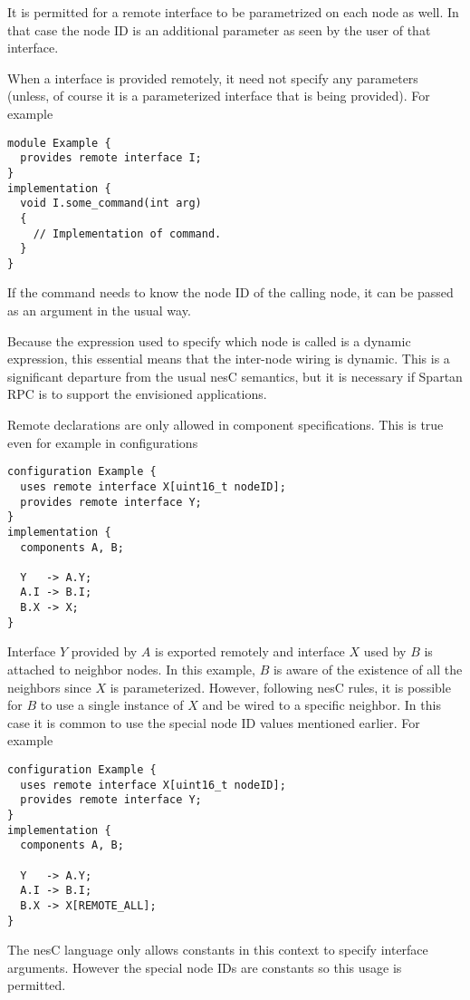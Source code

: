 It is permitted for a remote interface to be parametrized on each node as well. In that case
the node ID is an additional parameter as seen by the user of that interface.

When a interface is provided remotely, it need not specify any parameters (unless, of course
it is a parameterized interface that is being provided). For example
\begin{verbatim}
module Example {
  provides remote interface I;
}
implementation {
  void I.some_command(int arg)
  {
    // Implementation of command.
  }
}
\end{verbatim}

If the command needs to know the node ID of the calling node, it can be passed as an argument in
the usual way.

Because the expression used to specify which node is called is a dynamic expression, this
essential means that the inter-node wiring is dynamic. This is a significant departure from the
usual nesC semantics, but it is necessary if Spartan RPC is to support the envisioned
applications.

Remote declarations are only allowed in component specifications. This is true even for
example in configurations
\begin{verbatim}
configuration Example {
  uses remote interface X[uint16_t nodeID];
  provides remote interface Y;
}
implementation {
  components A, B;
  
  Y   -> A.Y;
  A.I -> B.I;
  B.X -> X;
}
\end{verbatim}

Interface $Y$ provided by $A$ is exported remotely and interface $X$ used by $B$ is attached to
neighbor nodes. In this example, $B$ is aware of the existence of all the neighbors since $X$ is
parameterized. However, following nesC rules, it is possible for $B$ to use a single instance of
$X$ and be wired to a specific neighbor. In this case it is common to use the special node ID
values mentioned earlier. For example
\begin{verbatim}
configuration Example {
  uses remote interface X[uint16_t nodeID];
  provides remote interface Y;
}
implementation {
  components A, B;
  
  Y   -> A.Y;
  A.I -> B.I;
  B.X -> X[REMOTE_ALL];
}
\end{verbatim}

The nesC language only allows constants in this context to specify interface arguments. However
the special node IDs are constants so this usage is permitted.

